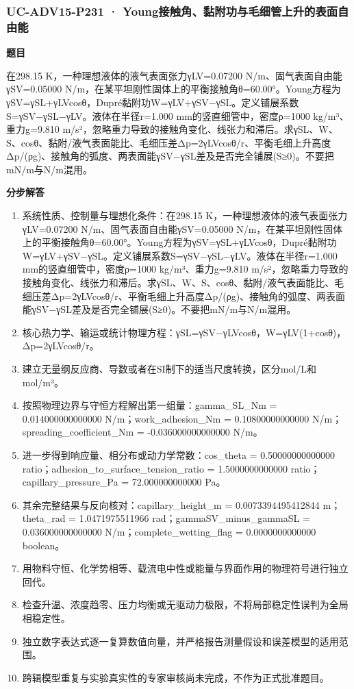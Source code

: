 \documentclass[UTF8,11pt,a4paper]{ctexart}
\begin{document}
\subsubsection*{UC-ADV15-P231 · Young接触角、黏附功与毛细管上升的表面自由能}
\noindent\textbf{题目}\par
在298.15 K，一种理想液体的液气表面张力γLV=0.07200 N/m、固气表面自由能γSV=0.05000 N/m，在某平坦刚性固体上的平衡接触角θ=60.00°。Young方程为γSV=γSL+γLVcosθ，Dupré黏附功W=γLV+γSV−γSL。定义铺展系数S=γSV−γSL−γLV。液体在半径r=1.000 mm的竖直细管中，密度ρ=1000 kg/m³、重力g=9.810 m/s²，忽略重力导致的接触角变化、线张力和滞后。求γSL、W、S、cosθ、黏附/液气表面能比、毛细压差Δp=2γLVcosθ/r、平衡毛细上升高度Δp/(ρg)、接触角的弧度、两表面能γSV−γSL差及是否完全铺展(S≥0)。不要把mN/m与N/m混用。\par
\medskip\noindent\textbf{分步解答}
\begin{enumerate}
\item 系统性质、控制量与理想化条件：在298.15 K，一种理想液体的液气表面张力γLV=0.07200 N/m、固气表面自由能γSV=0.05000 N/m，在某平坦刚性固体上的平衡接触角θ=60.00°。Young方程为γSV=γSL+γLVcosθ，Dupré黏附功W=γLV+γSV−γSL。定义铺展系数S=γSV−γSL−γLV。液体在半径r=1.000 mm的竖直细管中，密度ρ=1000 kg/m³、重力g=9.810 m/s²，忽略重力导致的接触角变化、线张力和滞后。求γSL、W、S、cosθ、黏附/液气表面能比、毛细压差Δp=2γLVcosθ/r、平衡毛细上升高度Δp/(ρg)、接触角的弧度、两表面能γSV−γSL差及是否完全铺展(S≥0)。不要把mN/m与N/m混用。
\item 核心热力学、输运或统计物理方程：γSL=γSV−γLVcosθ，W=γLV(1+cosθ)，Δp=2γLVcosθ/r。
\item 建立无量纲反应商、导数或者在SI制下的适当尺度转换，区分mol/L和mol/m³。
\item 按照物理边界与守恒方程解出第一组量：gamma\_SL\_Nm = 0.014000000000000 N/m；work\_adhesion\_Nm = 0.10800000000000 N/m；spreading\_coefficient\_Nm = -0.036000000000000 N/m。
\item 进一步得到响应量、相分布或动力学常数：cos\_theta = 0.50000000000000 ratio；adhesion\_to\_surface\_tension\_ratio = 1.5000000000000 ratio；capillary\_pressure\_Pa = 72.000000000000 Pa。
\item 其余完整结果与反向核对：capillary\_height\_m = 0.0073394495412844 m；theta\_rad = 1.0471975511966 rad；gammaSV\_minus\_gammaSL = 0.036000000000000 N/m；complete\_wetting\_flag = 0.0000000000000 boolean。
\item 用物料守恒、化学势相等、载流电中性或能量与界面作用的物理符号进行独立回代。
\item 检查升温、浓度趋零、压力均衡或无驱动力极限，不将局部稳定性误判为全局相稳定性。
\item 独立数字表达式逐一复算数值向量，并严格报告测量假设和误差模型的适用范围。
\item 跨辑模型重复与实验真实性的专家审核尚未完成，不作为正式批准题目。
\end{enumerate}
\end{document}

